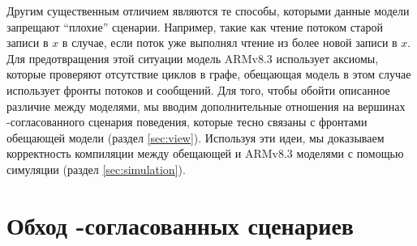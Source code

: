 Другим существенным отличием являются те способы, которыми данные модели запрещают ``плохие'' сценарии.  Например,
такие как чтение потоком старой записи в $x$ в случае, если поток уже выполнял чтение из более новой записи в $x$.
Для предотвращения этой ситуации модель ARMv8.3 использует аксиомы, которые проверяют отсутствие циклов в графе, 
обещающая модель в этом случае использует фронты потоков и сообщений.
Для того, чтобы обойти описанное различие между моделями,
мы вводим дополнительные отношения на вершинах \ARM-согласованного сценария поведения,
которые тесно связаны с фронтами обещающей модели (раздел \ref{sec:view}).
Используя эти идеи, мы доказываем корректность компиляции между обещающей и ARMv8.3 моделями
с помощью симуляции (раздел \ref{sec:simulation}).

\section{Обход \ARM-согласованных сценариев}
\label{sec:traversal}

